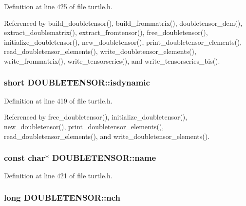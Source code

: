 Definition at line 425 of file turtle.\-h.



Referenced by build\-\_\-doubletensor(), build\-\_\-frommatrix(), doubletensor\-\_\-dem(), extract\-\_\-doublematrix(), extract\-\_\-fromtensor(), free\-\_\-doubletensor(), initialize\-\_\-doubletensor(), new\-\_\-doubletensor(), print\-\_\-doubletensor\-\_\-elements(), read\-\_\-doubletensor\-\_\-elements(), write\-\_\-doubletensor\-\_\-elements(), write\-\_\-frommatrix(), write\-\_\-tensorseries(), and write\-\_\-tensorseries\-\_\-bis().

\hypertarget{struct_d_o_u_b_l_e_t_e_n_s_o_r_a3ea231d38f5aeff822353461622d891d}{
\subsubsection[{isdynamic}]{\setlength{\rightskip}{0pt plus 5cm}short D\-O\-U\-B\-L\-E\-T\-E\-N\-S\-O\-R\-::isdynamic}}\label{struct_d_o_u_b_l_e_t_e_n_s_o_r_a3ea231d38f5aeff822353461622d891d}


Definition at line 419 of file turtle.\-h.



Referenced by free\-\_\-doubletensor(), initialize\-\_\-doubletensor(), new\-\_\-doubletensor(), print\-\_\-doubletensor\-\_\-elements(), read\-\_\-doubletensor\-\_\-elements(), and write\-\_\-doubletensor\-\_\-elements().

\hypertarget{struct_d_o_u_b_l_e_t_e_n_s_o_r_a01ca6ab74ced24c95b59fce620a1ed52}{
\subsubsection[{name}]{\setlength{\rightskip}{0pt plus 5cm}const char$\ast$ D\-O\-U\-B\-L\-E\-T\-E\-N\-S\-O\-R\-::name}}\label{struct_d_o_u_b_l_e_t_e_n_s_o_r_a01ca6ab74ced24c95b59fce620a1ed52}


Definition at line 421 of file turtle.\-h.

\hypertarget{struct_d_o_u_b_l_e_t_e_n_s_o_r_a1db8a36e26596f955bdd27c459ae7052}{
\subsubsection[{nch}]{\setlength{\rightskip}{0pt plus 5cm}long D\-O\-U\-B\-L\-E\-T\-E\-N\-S\-O\-R\-::nch}}\label{struct_d_o_u_b_l_e_t_e_n_s_o_r_a1db8a36e26596f955bdd27c459ae7052}


